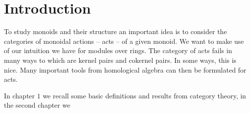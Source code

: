 \chapter*{Introduction}

To study monoids and their structure an important idea is to consider the categories of monoidal actions -- acts -- of a given monoid. 
We want to make use of our intuition we have for modules over rings. The category of acts fails in many ways to
which are kernel pairs and cokernel pairs. In some ways, this is nice. 
Many important tools from homological algebra can then be formulated for acts.\par 
In chapter $1$ we recall some basic definitions and results from category theory, in the second 
chapter we 